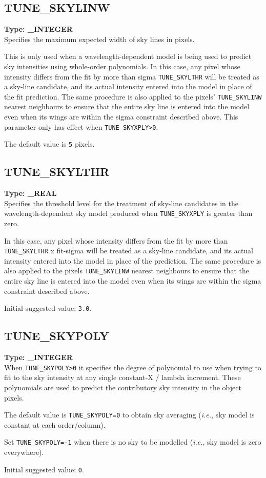 \documentclass[11pt,twoside]{article}
\makeatletter
\newcommand{\htmlref}[2]{#1}
\newcommand{\xlabel}[1]{}
\newcommand{\sunspec}[2]{#1}
\renewcommand{\sunspec}[2]{#2}
\newcommand{\indexcmdname}[1]{\index{#1@\protect\cmdname{#1}}}
\renewcommand{\indexcmdname}[1]{}
\newcommand{\cmdname}{\begingroup \catcode`\_=12 \realcmdname}
\newcommand{\realcmdname}[1]{\endgroup\texttt{#1}}
\newcommand{\echparameter}[4]
{
\item [#1 = #3] \mbox{}\label{par_#2}\indexcmdname{#2}
\\
#4
}
\renewcommand{\echparameter}[4]
{
  \subsection{\xlabel{par_#2}\label{par_#2}{\bf #1}}
  {\bf Type: #3}\\
#4
}
\makeatother
\begin{document}
\echparameter{TUNE\_SKYLINW}{TUNE_SKYLINW}{
 \_INTEGER
}{
 Specifies the maximum expected width of sky lines in pixels.

 This
 is only used when a wavelength-dependent model is being used to
 predict sky intensities using whole-order polynomials.  In this
 case, any pixel whose intensity differs from the fit by more than
 sigma \htmlref{{\tt TUNE\_SKYLTHR}}{par_TUNE_SKYLTHR}
 will be treated as a sky-line candidate,
 and its actual intensity entered into the model in place of the fit
 prediction.  The same procedure is also applied to the pixels'
 {\tt TUNE\_SKYLINW} nearest neighbours to ensure that the entire sky line
 is entered into the model even when its wings are within the sigma
 constraint described above.  This parameter only has effect when
 \htmlref{{\tt TUNE\_SKYXPLY>0}}{par_TUNE_SKYXPLY}.

 The default value is \texttt{5} pixels.
}

\echparameter{TUNE\_SKYLTHR}{TUNE_SKYLTHR}{
 \_REAL
}{
 Specifies the threshold level for the treatment of sky-line
 candidates in the wavelength-dependent sky model produced when
 \htmlref{{\tt TUNE\_SKYXPLY}}{par_TUNE_SKYXPLY} is greater than zero.

 In this case, any pixel whose intensity differs from the fit
 by more than {\tt TUNE\_SKYLTHR} \sunspec{$\times$}{x} fit-sigma will be
 treated
 as a sky-line candidate, and its actual intensity entered into the model
 in place of the prediction.  The same procedure is also applied to the
 pixels \htmlref{{\tt TUNE\_SKYLINW}}{par_TUNE_SKYLINW} nearest neighbours to
 ensure that the entire
 sky line is entered into the model even when its wings are within
 the sigma constraint described above.

 Initial suggested value: \texttt{3.0}.
}

\echparameter{TUNE\_SKYPOLY}{TUNE_SKYPOLY}{
 \_INTEGER
}{
 When {\tt TUNE\_SKYPOLY>0} it specifies the degree of polynomial to use
 when trying to fit to the sky intensity at any single constant-X /
 lambda increment.  These polynomials are used to predict the
 contributory sky intensity in the object pixels.

 The default value is {\tt TUNE\_SKYPOLY=0} to obtain sky averaging
 ({\it{i.e.}},
 sky model is constant at each order/column).

 Set {\tt TUNE\_SKYPOLY=-1} when there is no sky to be modelled
 ({\it{i.e.}}, sky model is zero everywhere).

 Initial suggested value: \texttt{0}.
}
\end{document}
